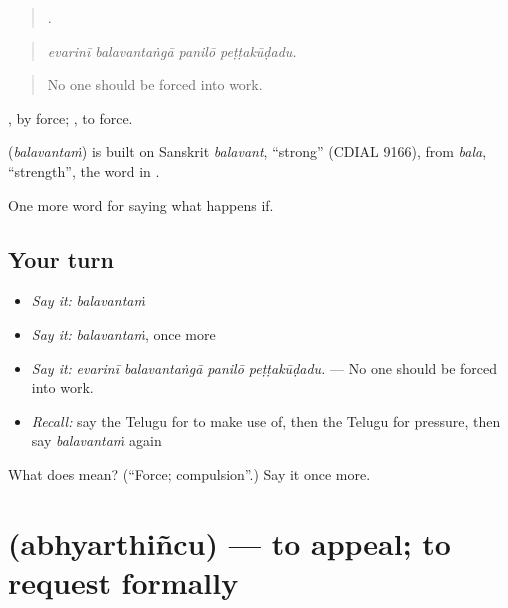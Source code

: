 \begin{quote}
   .
\end{quote}

\begin{quote}
\emph{evarinī balavantaṅgā panilō peṭṭakūḍadu.}
\end{quote}

\begin{quote}
No one should be forced into work.
\end{quote}

, by force;  , to force.

\begin{cousinweb}
\textbf{} (\emph{balavantaṁ}) is built on Sanskrit \emph{balavant}, \textquotedblleft{}strong\textquotedblright{} (CDIAL 9166), from \emph{bala}, \textquotedblleft{}strength\textquotedblright{}, the word in .
\end{cousinweb}

\begin{grammarlens}[title={What you've built}]
One more word for saying what happens if.
\end{grammarlens}

\subsection*{Your turn}
\begin{itemize}
\raggedright
  \item \emph{Say it:} \emph{balavantaṁ}
  \item \emph{Say it:} \emph{balavantaṁ}, once more
  \item \emph{Say it:} \emph{evarinī balavantaṅgā panilō peṭṭakūḍadu.} — No one should be forced into work.
  \item \emph{Recall:} say the Telugu for to make use of, then the Telugu for pressure, then say \emph{balavantaṁ} again
\end{itemize}

\begin{tcolorbox}[breakable,colback=teal!4,colframe=teal!35!black,title={Before you move on}]
What does  mean? (\textquotedblleft{}Force; compulsion\textquotedblright{}.) Say it once more.
\end{tcolorbox}
\section[\texorpdfstring{\te{అభ్యర్థించు} (abhyarthiñcu)}{అభ్యర్థించు (abhyarthiñcu)}]{ (abhyarthiñcu) — to appeal; to request formally}

